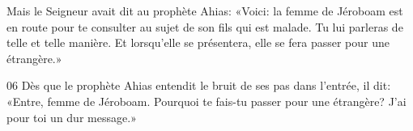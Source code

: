 Mais le Seigneur avait dit au prophète Ahias: «Voici: la femme de Jéroboam est en route pour te consulter au sujet de son fils qui est malade. Tu lui parleras de telle et telle manière. Et lorsqu’elle se présentera, elle se fera passer pour une étrangère.»

06 Dès que le prophète Ahias entendit le bruit de ses pas dans l’entrée, il dit: «Entre, femme de Jéroboam. Pourquoi te fais-tu passer pour une étrangère? J’ai pour toi un dur message.»
